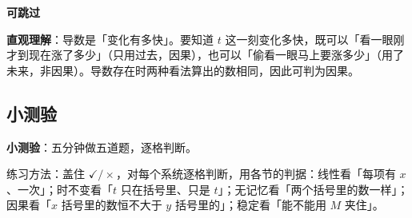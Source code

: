 \documentclass[UTF8,a4paper,11pt]{ctexart}
\newenvironment{skippable}{\begin{skipbox}\textbf{可跳过}\par\smallskip}{\end{skipbox}}
\newcounter{ex}[section]
\begin{document}
\begin{skippable}
\textbf{直观理解}：导数是「变化有多快」。要知道 $t$ 这一刻变化多快，既可以「看一眼刚才到现在涨了多少」（只用过去，因果），也可以「偷看一眼马上要涨多少」（用了未来，非因果）。导数存在时两种看法算出的数相同，因此可判为因果。
\end{skippable}

\subsection{小测验}
\textbf{小测验}：五分钟做五道题，逐格判断。

练习方法：盖住 $\checkmark/\times$，对每个系统逐格判断，用各节的判据：线性看「每项有 $x$、一次」；时不变看「$t$ 只在括号里、只是 $t$」；无记忆看「两个括号里的数一样」；因果看「$x$ 括号里的数恒不大于 $y$ 括号里的」；稳定看「能不能用 $M$ 夹住」。
\end{document}
